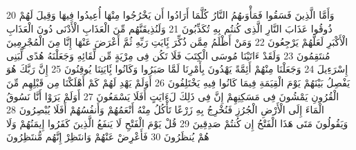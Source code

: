 \documentclass[20pt,a4paper]{article}
\begin{document}
{\tiny\colorbox{cl_aya}{20}} وَأَمَّا الَّذِينَ فَسَقُوا فَمَأْوَىهُمُ النَّارُ كُلَّمَا أَرَادُوا أَن يَخْرُجُوا مِنْهَا أُعِيدُوا فِيهَا وَقِيلَ لَهُمْ ذُوقُوا عَذَابَ النَّارِ الَّذِى كُنتُم بِهِ تُكَذِّبُونَ
{\tiny\colorbox{cl_aya}{21}} وَلَنُذِيقَنَّهُم مِّنَ الْعَذَابِ الْأَدْنَى دُونَ الْعَذَابِ الْأَكْبَرِ لَعَلَّهُمْ يَرْجِعُونَ
{\tiny\colorbox{cl_aya}{22}} وَمَنْ أَظْلَمُ مِمَّن ذُكِّرَ بَِٔايَتِ رَبِّهِ ثُمَّ أَعْرَضَ عَنْهَا إِنَّا مِنَ الْمُجْرِمِينَ مُنتَقِمُونَ
{\tiny\colorbox{cl_aya}{23}} وَلَقَدْ ءَاتَيْنَا مُوسَى الْكِتَبَ فَلَا تَكُن فِى مِرْيَةٍ مِّن لِّقَائِهِ وَجَعَلْنَهُ هُدًى لِّبَنِى إِسْرَءِيلَ
{\tiny\colorbox{cl_aya}{24}} وَجَعَلْنَا مِنْهُمْ أَئِمَّةً يَهْدُونَ بِأَمْرِنَا لَمَّا صَبَرُوا وَكَانُوا بَِٔايَتِنَا يُوقِنُونَ
{\tiny\colorbox{cl_aya}{25}} إِنَّ رَبَّكَ هُوَ يَفْصِلُ بَيْنَهُمْ يَوْمَ الْقِيَمَةِ فِيمَا كَانُوا فِيهِ يَخْتَلِفُونَ
{\tiny\colorbox{cl_aya}{26}} أَوَلَمْ يَهْدِ لَهُمْ كَمْ أَهْلَكْنَا مِن قَبْلِهِم مِّنَ الْقُرُونِ يَمْشُونَ فِى مَسَكِنِهِمْ إِنَّ فِى ذَلِكَ لَءَايَتٍ أَفَلَا يَسْمَعُونَ
{\tiny\colorbox{cl_aya}{27}} أَوَلَمْ يَرَوْا أَنَّا نَسُوقُ الْمَاءَ إِلَى الْأَرْضِ الْجُرُزِ فَنُخْرِجُ بِهِ زَرْعًا تَأْكُلُ مِنْهُ أَنْعَمُهُمْ وَأَنفُسُهُمْ أَفَلَا يُبْصِرُونَ
{\tiny\colorbox{cl_aya}{28}} وَيَقُولُونَ مَتَى هَذَا الْفَتْحُ إِن كُنتُمْ صَدِقِينَ
{\tiny\colorbox{cl_aya}{29}} قُلْ يَوْمَ الْفَتْحِ لَا يَنفَعُ الَّذِينَ كَفَرُوا إِيمَنُهُمْ وَلَا هُمْ يُنظَرُونَ
{\tiny\colorbox{cl_aya}{30}} فَأَعْرِضْ عَنْهُمْ وَانتَظِرْ إِنَّهُم مُّنتَظِرُونَ
\end{document}

